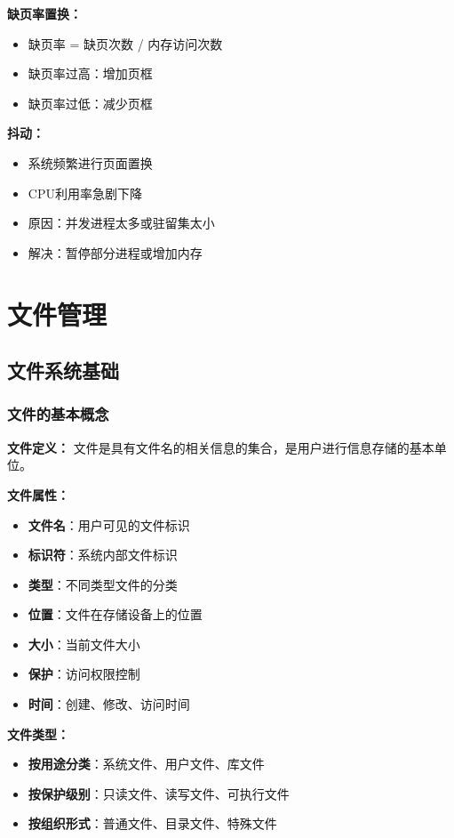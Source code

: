 \documentclass[lang=cn,newtx,10pt,scheme=chinese]{../../elegantbook}
\begin{document}
\textbf{缺页率置换：}
\begin{itemize}
  \item 缺页率 = 缺页次数 / 内存访问次数
  \item 缺页率过高：增加页框
  \item 缺页率过低：减少页框
\end{itemize}

\textbf{抖动：}
\begin{itemize}
  \item 系统频繁进行页面置换
  \item CPU利用率急剧下降
  \item 原因：并发进程太多或驻留集太小
  \item 解决：暂停部分进程或增加内存
\end{itemize}

\chapter{文件管理}

\section{文件系统基础}

\subsection{文件的基本概念}

\textbf{文件定义：}
文件是具有文件名的相关信息的集合，是用户进行信息存储的基本单位。

\textbf{文件属性：}
\begin{itemize}
  \item \textbf{文件名}：用户可见的文件标识
  \item \textbf{标识符}：系统内部文件标识
  \item \textbf{类型}：不同类型文件的分类
  \item \textbf{位置}：文件在存储设备上的位置
  \item \textbf{大小}：当前文件大小
  \item \textbf{保护}：访问权限控制
  \item \textbf{时间}：创建、修改、访问时间
\end{itemize}

\textbf{文件类型：}
\begin{itemize}
  \item \textbf{按用途分类}：系统文件、用户文件、库文件
  \item \textbf{按保护级别}：只读文件、读写文件、可执行文件
  \item \textbf{按组织形式}：普通文件、目录文件、特殊文件
\end{itemize}
\end{document}
